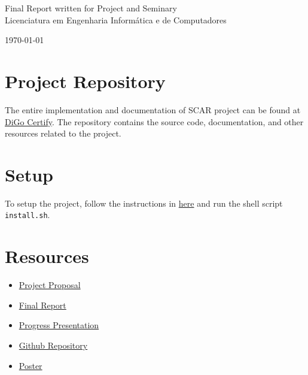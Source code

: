 \documentclass[10pt]{report}
\begin{document}
\begin{center}
\begin{large}
        \vspace{1.25cm}

        \begin{Large}
            Final Report written for Project and Seminary \\ \vspace{.25cm}
            Licenciatura em Engenharia Informática e de Computadores
        \end{Large}
    \end{large}

    \vspace{1.75cm} \today \vspace{.75cm}

\end{center}

\section{Project Repository}
The entire implementation and documentation of SCAR project can be found at \href{https://github.com/DiGo-Certify/DiGo-certify-app}{DiGo Certify}.
The repository contains the source code, documentation, and other resources related to the project.

\section{Setup}
To setup the project, follow the instructions in \href{https://github.com/DiGo-Certify/DiGo-certify-app}{here} and run the shell script \texttt{install.sh}.

\section{Resources}
\begin{itemize}
    \item \href{https://github.com/DiGo-Certify/DiGo-certify-app/blob/main/docs/project-proposal/project-proposal.pdf}{Project Proposal}
    \item \href{https://github.com/DiGo-Certify/DiGo-certify-app/blob/main/docs/final-report/report.pdf}{Final Report}
    \item \href{https://github.com/DiGo-Certify/DiGo-certify-app/blob/main/docs/progress-presentation.pdf}{Progress Presentation}
    \item \href{https://github.com/DiGo-Certify/DiGo-certify-app}{Github Repository}
    \item \href{https://github.com/DiGo-Certify/DiGo-certify-app/blob/main/docs/poster.pdf}{Poster}
\end{itemize}


\vspace{.75cm}



\end{document}

